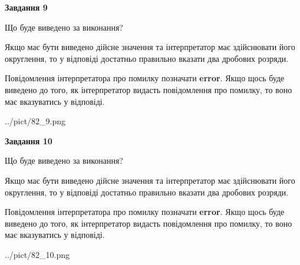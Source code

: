 \documentclass[12pt, ukrainian]{article}
\begin{document}
{\begin {Large}
{\begin {center}\textbf{Завдання 9}\end {center}}\par
Що буде виведено за виконання? \par

Якщо має бути виведено дійсне значення та інтерпретатор має здійснювати його округлення, 
то у відповіді достатньо правильно вказати два дробових розряди.

Повідомлення інтерпретатора про помилку позначати \textbf{error}.
Якщо щось буде виведено до того, як інтерпретатор видасть повідомлення про помилку, 
то воно має вказуватись у відповіді. \par

\begin{center}
	{../pict/82_9.png}
\end{center}
\newpage

{\begin {center}\textbf{Завдання 10}\end {center}}\par
Що буде виведено за виконання? \par

Якщо має бути виведено дійсне значення та інтерпретатор має здійснювати його округлення, 
то у відповіді достатньо правильно вказати два дробових розряди.

Повідомлення інтерпретатора про помилку позначати \textbf{error}.
Якщо щось буде виведено до того, як інтерпретатор видасть повідомлення про помилку, 
то воно має вказуватись у відповіді. \par

\begin{center}
	{../pict/82_10.png}
\end{center}
\newpage

\end {Large}}
\end{document}
